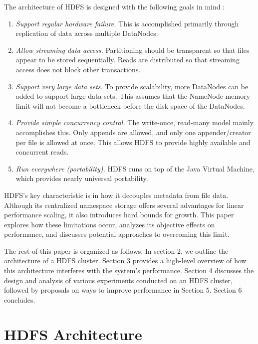 \documentclass[11pt, a4paper]{article}
\begin{document}
\begin{multicols*}{2}
The architecture of HDFS is designed with the following goals in mind \cite{HdfsGuide}:
\begin{enumerate}[noitemsep, label=\arabic*.]
	\item\textit{Support regular hardware failure.} This is accomplished primarily through replication of data across multiple DataNodes.
	\item\textit{Allow streaming data access.} Partitioning should be transparent so that files appear to be stored sequentially. Reads are distributed so that streaming access does not block other transactions.
	\item\textit{Support very large data sets.} To provide scalability, more DataNodes can be added to support large data sets. This assumes that the NameNode memory limit will not become a bottleneck before the disk space of the DataNodes.
	\item\textit{Provide simple concurrency control.} The write-once, read-many model mainly accomplishes this. Only appends are allowed, and only one appender/creator per file is allowed at once. This allows HDFS to provide highly available and concurrent reads.
	\item\textit{Run everywhere (portability).} HDFS runs on top of the Java Virtual Machine, which provides nearly universal portability.
\end{enumerate}

HDFS's key characteristic is in how it decouples metadata from file data. Although its centralized namespace storage offers several advantages for linear performance scaling, it also introduces hard bounds for growth. This paper explores how these limitations occur, analyzes its objective effects on performance, and discusses potential approaches to overcoming this limit.

The rest of this paper is organized as follows. In section 2, we outline the architecture of a HDFS cluster. Section 3 provides a high-level overview of how this architecture interferes with the system's performance. Section 4 discusses the design and analysis of various experiments conducted on an HDFS cluster, followed by proposals on ways to improve performance in Section 5. Section 6 concludes.

\section{HDFS Architecture}


\end{multicols*}
\end{document}
